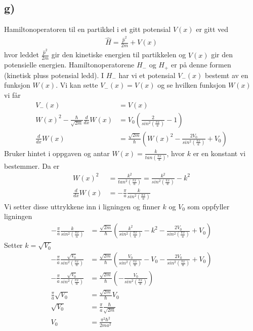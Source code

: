 \documentclass[norsk,a4paper,12pt]{article}
\begin{document}
\subsection*{g)}
Hamiltonoperatoren til en partikkel i et gitt potensial $V(x)$ er gitt ved
\begin{equation}
\begin{aligned}
	\hat{H} = \frac{\hat{p}^2}{2m} + V(x)
\end{aligned}
\end{equation}
hvor leddet $\frac{\hat{p}^2}{2m}$ gir den kinetiske energien til partikkelen og $V(x)$ gir den potensielle energien. Hamiltonoperatorene $H_-$ og $H_+$ er på denne formen (kinetisk pluss potensial ledd). I $H_-$ har vi et potensial $V_-(x)$ bestemt av en funksjon $W(x)$. Vi kan sette $V_-(x) = V(x)$ og se hvilken funksjon $W(x)$ vi får
\begin{equation}
\begin{aligned}
	V_-(x) &= V(x) \\
	W(x)^2 - \frac{\hbar}{\sqrt{2m}} \frac{d}{d x}W(x) &= V_0(\frac{2}{sin^2(\frac{\pi x}{a})} - 1) \\
	\frac{d}{d x}W(x) &= \frac{\sqrt{2m}}{\hbar} (W(x)^2 - \frac{2V_0}{sin^2(\frac{\pi x}{a})} + V_0)
\end{aligned}
\end{equation}
Bruker hintet i oppgaven og antar $W(x) = \frac{k}{tan(\frac{\pi x}{a})}$, hvor $k$ er en konstant vi bestemmer. Da er 
\begin{equation}
\begin{aligned}
	W(x)^2 &= \frac{k^2}{tan^2(\frac{\pi x}{a})} = \frac{k^2}{sin^2(\frac{\pi x}{a})} - k^2 \\
	\frac{d}{d x}W(x) &= -\frac{\pi}{a} \frac{k}{sin^2(\frac{\pi x}{a})}
\end{aligned}
\end{equation}
Vi setter disse uttrykkene inn i ligningen og finner $k$ og $V_0$ som oppfyller ligningen
\begin{equation}
\begin{aligned}
	-\frac{\pi}{a} \frac{k}{sin^2(\frac{\pi x}{a})} &= \frac{\sqrt{2m}}{\hbar} (\frac{k^2}{sin^2(\frac{\pi x}{a})} - k^2 - \frac{2V_0}{sin^2(\frac{\pi x}{a})} + V_0)
\end{aligned}
\end{equation}
Setter $k = \sqrt{V_0}$
\begin{equation}
\begin{aligned}
	-\frac{\pi}{a} \frac{\sqrt{V_0}}{sin^2(\frac{\pi x}{a})} &= \frac{\sqrt{2m}}{\hbar} (\frac{V_0}{sin^2(\frac{\pi x}{a})} - V_0 - \frac{2V_0}{sin^2(\frac{\pi x}{a})} + V_0) \\
	-\frac{\pi}{a} \frac{\sqrt{V_0}}{sin^2(\frac{\pi x}{a})} &= \frac{\sqrt{2m}}{\hbar} (-\frac{V_0}{sin^2(\frac{\pi x}{a})}) \\
	\frac{\pi}{a} \sqrt{V_0} &= \frac{\sqrt{2m}}{\hbar} V_0 \\
	\sqrt{V_0} &= \frac{\pi}{a} \frac{\hbar}{\sqrt{2m}} \\
V_0 &= \frac{\pi^2\hbar^2}{2ma^2}
\end{aligned}
\end{equation}
\end{document}
